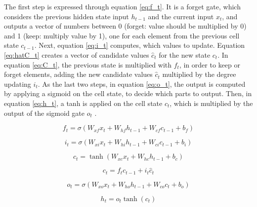 The first step is expressed through equation \ref{eq:f_t}. It is a forget gate, which considers the previous hidden state input $h_{t-1}$ and the current input $x_t$, and outputs a vector of numbers between 0 (forget: value should be multiplied by 0) and 1 (keep: multiply value by 1), one for each element from the previous cell state $c_{t-1}$. Next, equation \ref{eq:i_t} computes, which values to update. Equation \ref{eq:hatC_t} creates a vector of candidate values $\hat{c}_t$ for the new state $c_t$. In equation \ref{eq:C_t}, the previous state is multiplied with $f_t$, in order to keep or forget elements, adding the new candidate values $\hat{c}_t$ multiplied by the degree updating $i_t$. As the last two steps, in equation \ref{eq:o_t}, the output is computed by applying a sigmoid on the cell state, to decide which parts to output. Then, in equation \ref{eq:h_t}, a tanh is applied on the cell state $c_t$, which is multiplied by the output of the sigmoid gate $o_t$ \cite{colahlstm} \cite{graves2013speech}.

\begin{equation} \label{eq:f_t}
	f_t = \sigma(W_{xf}x_t + W_{hf}h_{t-1} + W_{cf}c_{t-1} + b_f)
\end{equation}

\begin{equation} \label{eq:i_t}
	i_t = \sigma(W_{xi}x_t + W_{hi}h_{t-1} + W_{ci}c_{t-1} + b_i)
\end{equation}

\begin{equation} \label{eq:hatC_t}
	\hat{c}_t = \tanh(W_{xc}x_t + W_{hc}h_{t-1} + b_c)
\end{equation}

\begin{equation} \label{eq:C_t}
	c_t = f_t c_{t-1} + i_t \hat{c}_t
\end{equation}

\begin{equation} \label{eq:o_t}
	o_t = \sigma (W_{xo}x_t + W_{ho}h_{t-1} + W_{co}c_t + b_o)
\end{equation}

\begin{equation} \label{eq:h_t}
	h_t = o_t \tanh(c_t)
\end{equation}


